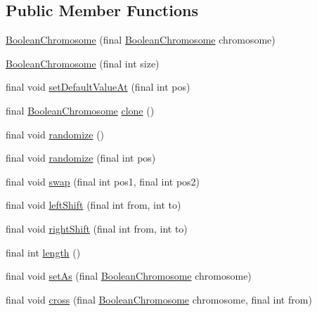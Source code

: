 \subsection*{Public Member Functions}
\begin{DoxyCompactItemize}
\item 
\hyperlink{classjenes_1_1chromosome_1_1_boolean_chromosome_add8b8de56dc676084576bcc657125414}{Boolean\-Chromosome} (final \hyperlink{classjenes_1_1chromosome_1_1_boolean_chromosome}{Boolean\-Chromosome} chromosome)
\item 
\hyperlink{classjenes_1_1chromosome_1_1_boolean_chromosome_aea950688e012d2bfe97f4f24a3fc1db6}{Boolean\-Chromosome} (final int size)
\item 
final void \hyperlink{classjenes_1_1chromosome_1_1_boolean_chromosome_adf2084640bd92e4d36ffea9142e39f8e}{set\-Default\-Value\-At} (final int pos)
\item 
final \hyperlink{classjenes_1_1chromosome_1_1_boolean_chromosome}{Boolean\-Chromosome} \hyperlink{classjenes_1_1chromosome_1_1_boolean_chromosome_a0f0ea11e413734e15dc659a3d0831801}{clone} ()
\item 
final void \hyperlink{classjenes_1_1chromosome_1_1_boolean_chromosome_ab02039091f6803486d54b4f124a39b63}{randomize} ()
\item 
final void \hyperlink{classjenes_1_1chromosome_1_1_boolean_chromosome_af0249c8a5452c3a13960543ab23d4aae}{randomize} (final int pos)
\item 
final void \hyperlink{classjenes_1_1chromosome_1_1_boolean_chromosome_a6359dc1f495e4f7967c6a84f3206de40}{swap} (final int pos1, final int pos2)
\item 
final void \hyperlink{classjenes_1_1chromosome_1_1_boolean_chromosome_a96c0fb9c3f1668cbc9ca175a183f69d4}{left\-Shift} (final int from, int to)
\item 
final void \hyperlink{classjenes_1_1chromosome_1_1_boolean_chromosome_a866689aeafc1b4a5e83c14a1605bc7ce}{right\-Shift} (final int from, int to)
\item 
final int \hyperlink{classjenes_1_1chromosome_1_1_boolean_chromosome_a4665770a8e625c26f3704b41fecb10f8}{length} ()
\item 
final void \hyperlink{classjenes_1_1chromosome_1_1_boolean_chromosome_a16d9851ba21583010d003378a7d59d19}{set\-As} (final \hyperlink{classjenes_1_1chromosome_1_1_boolean_chromosome}{Boolean\-Chromosome} chromosome)
\item 
final void \hyperlink{classjenes_1_1chromosome_1_1_boolean_chromosome_aa1c3c421b6e8e6db44fb7cce7443e669}{cross} (final \hyperlink{classjenes_1_1chromosome_1_1_boolean_chromosome}{Boolean\-Chromosome} chromosome, final int from)

\end{DoxyCompactItemize}

